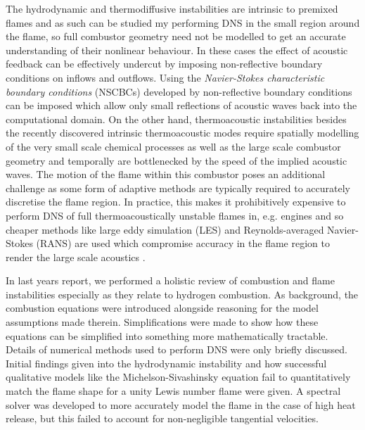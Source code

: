 The hydrodynamic and thermodiffusive instabilities are intrinsic to premixed flames and as such can be studied my performing DNS in the small region around the flame, so full combustor geometry need not be modelled to get an accurate understanding of their nonlinear behaviour. In these cases the effect of acoustic feedback can be effectively undercut by imposing non-reflective boundary conditions on inflows and outflows. Using the \emph{Navier-Stokes characteristic boundary conditions} (NSCBCs) developed by \cite{thompson1990TimeDependentBoundaryConditions, poinsot1992BoundaryConditionsDirect, poinsot2001TheoreticalNumericalCombustion, sutherland2003ImprovedBoundaryConditions} non-reflective boundary conditions can be imposed which allow only small reflections of acoustic waves back into the computational domain. On the other hand, thermoacoustic instabilities besides the recently discovered intrinsic thermoacoustic modes \cite{silva2023IntrinsicThermoacousticInstabilities} require spatially modelling of the very small scale chemical processes as well as the large scale combustor geometry and temporally are bottlenecked by the speed of the implied acoustic waves. The motion of the flame within this combustor poses an additional challenge as some form of adaptive methods are typically required to accurately discretise the flame region. In practice, this makes it prohibitively expensive to perform DNS of full thermoacoustically unstable flames in, e.g. engines and so cheaper methods like large eddy simulation (LES) and Reynolds-averaged Navier-Stokes (RANS) are used which compromise accuracy in the flame region to render the large scale acoustics \cite{yang2015LargeEddySimulationPresent, domingo2023RecentDevelopmentsDNS}.

In last years report, we performed a holistic review of combustion and flame instabilities especially as they relate to hydrogen combustion. As background, the combustion equations were introduced alongside reasoning for the model assumptions made therein. Simplifications were made to show how these equations can be simplified into something more mathematically tractable. Details of numerical methods used to perform DNS were only briefly discussed. Initial findings given into the hydrodynamic instability and how successful qualitative models like the Michelson-Sivashinsky equation \cite{sivashinsky1977NonlinearAnalysisHydrodynamic, michelson1977NonlinearAnalysisHydrodynamic} fail to quantitatively match the flame shape for a unity Lewis number flame were given. A spectral solver was developed to more accurately model the flame in the case of high heat release, but this failed to account for non-negligible tangential velocities.

